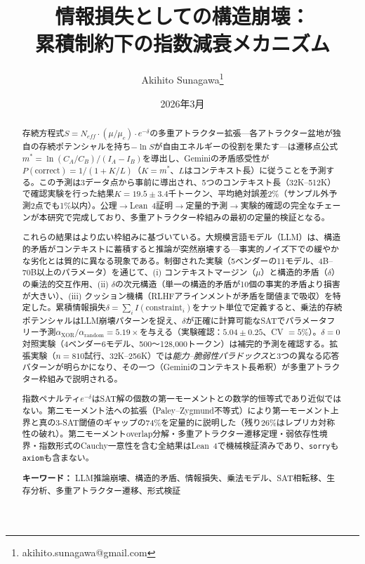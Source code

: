 \documentclass[11pt,a4paper]{article}
\title{情報損失としての構造崩壊：\\累積制約下の指数減衰メカニズム}
\author{Akihito Sunagawa\thanks{akihito.sunagawa@gmail.com}}
\date{2026年3月}
\begin{document}
\maketitle

\begin{abstract}
存続方程式$S = N_{eff} \cdot (\mu/\mu_c) \cdot e^{-\delta}$の多重アトラクター拡張---各アトラクター盆地が独自の存続ポテンシャルを持ち$-\ln S$が自由エネルギーの役割を果たす---は遷移点公式$m^* = \ln(C_A/C_B)/(I_A - I_B)$を導出し、Geminiの矛盾感受性が$P(\text{correct}) = 1/(1 + K/L)$（$K = m^*$、$L$はコンテキスト長）に従うことを予測する。この予測は3データ点から事前に導出され、5つのコンテキスト長（32K--512K）で確認実験を行った結果$K = 19.5 \pm 3.4$千トークン、平均絶対誤差2\%（サンプル外予測2点でも1\%以内）。公理$\to$Lean~4証明$\to$定量的予測$\to$実験的確認の完全なチェーンが本研究で完成しており、多重アトラクター枠組みの最初の定量的検証となる。

これらの結果はより広い枠組みに基づいている。大規模言語モデル（LLM）は、構造的矛盾がコンテキストに蓄積すると推論が突然崩壊する---事実的ノイズ下での緩やかな劣化とは質的に異なる現象である。制御された実験（5ベンダーの11モデル、4B--70B以上のパラメータ）を通じて、(i) コンテキストマージン（$\mu$）と構造的矛盾（$\delta$）の乗法的交互作用、(ii) $\delta$の次元構造（単一の構造的矛盾が10個の事実的矛盾より損害が大きい）、(iii) クッション機構（RLHFアラインメントが矛盾を閾値まで吸収）を特定した。累積情報損失$\delta = \sum_i I(\text{constraint}_i)$をナット単位で定義すると、乗法的存続ポテンシャルはLLM崩壊パターンを捉え、$\delta$が正確に計算可能なSATでパラメータフリー予測$\alpha_{\text{XOR}}/\alpha_{\text{random}} = 5.19\times$を与える（実験確認：$5.04 \pm 0.25$、CV $= 5\%$）。$\delta = 0$対照実験（4ベンダー6モデル、500〜128{,}000トークン）は補完的予測を確認する。拡張実験（$n = 810$試行、32K--256K）では\emph{能力--脆弱性パラドックス}と3つの異なる応答パターンが明らかになり、その一つ（Geminiのコンテキスト長希釈）が多重アトラクター枠組みで説明される。

指数ペナルティ$e^{-\delta}$はSAT解の個数の第一モーメントとの数学的恒等式であり近似ではない。第二モーメント法への拡張（Paley--Zygmund不等式）により第一モーメント上界と真の3-SAT閾値のギャップの74\%を定量的に説明した（残り26\%はレプリカ対称性の破れ）。第二モーメントoverlap分解・多重アトラクター遷移定理・弱依存性境界・指数形式のCauchy一意性を含む全結果はLean~4で機械検証済みであり、\texttt{sorry}も\texttt{axiom}も含まない。

\medskip
\noindent\textbf{キーワード：} LLM推論崩壊、構造的矛盾、情報損失、乗法モデル、SAT相転移、生存分析、多重アトラクター遷移、形式検証
\end{abstract}
\end{document}
